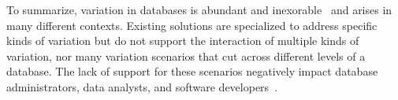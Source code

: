 


To summarize, variation in databases is abundant and
inexorable~\cite{dbDecay16Stonebraker} and arises in many different contexts.
Existing solutions are specialized to address specific kinds of variation but
do not support the interaction of multiple kinds of variation, nor many
variation scenarios that cut across different levels of a database. The lack of
support for these scenarios negatively impact database administrators, data
analysts, and software developers~\cite{dbSPLevolve}. 


